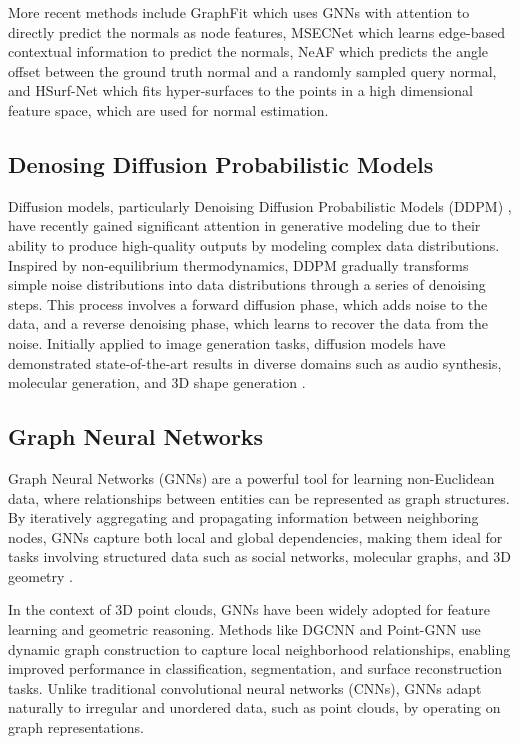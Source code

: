 \documentclass{acmart}
\begin{document}
More recent methods include GraphFit \cite{li2022graphfit} which uses GNNs with attention to directly predict the normals as node features, MSECNet \cite{xiu2023msecnet} which learns edge-based contextual information to predict the normals, NeAF \cite{li2023neaf} which predicts the angle offset between the ground truth normal and a randomly sampled query normal, and HSurf-Net \cite{li2022hsurf} which fits hyper-surfaces to the points in a high dimensional feature space, which are used for normal estimation.

\subsection{Denosing Diffusion Probabilistic Models}
Diffusion models, particularly Denoising Diffusion Probabilistic Models (DDPM) \cite{ho2020denoising}, have recently gained significant attention in generative modeling due to their ability to produce high-quality outputs by modeling complex data distributions. Inspired by non-equilibrium thermodynamics, DDPM gradually transforms simple noise distributions into data distributions through a series of denoising steps. This process involves a forward diffusion phase, which adds noise to the data, and a reverse denoising phase, which learns to recover the data from the noise.
Initially applied to image generation tasks, diffusion models have demonstrated state-of-the-art results in diverse domains such as audio synthesis, molecular generation, and 3D shape generation \cite{cao2024survey,yang2023diffusion}.

\subsection{Graph Neural Networks}
Graph Neural Networks (GNNs) are a powerful tool for learning non-Euclidean data, where relationships between entities can be represented as graph structures. By iteratively aggregating and propagating information between neighboring nodes, GNNs capture both local and global dependencies, making them ideal for tasks involving structured data such as social networks, molecular graphs, and 3D geometry \cite{Wu_2021,ju2024survey}.

In the context of 3D point clouds, GNNs have been widely adopted for feature learning and geometric reasoning. Methods like DGCNN \cite{wang2019dynamic} and Point-GNN \cite{shi2020point} use dynamic graph construction to capture local neighborhood relationships, enabling improved performance in classification, segmentation, and surface reconstruction tasks. Unlike traditional convolutional neural networks (CNNs), GNNs adapt naturally to irregular and unordered data, such as point clouds, by operating on graph representations.
\end{document}
